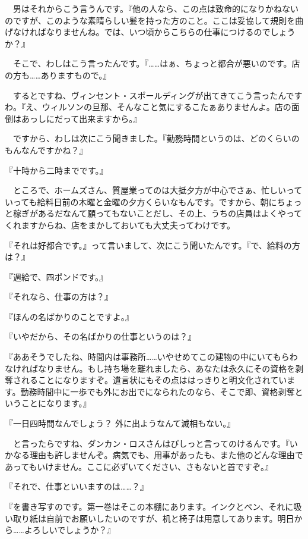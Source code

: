 \documentclass[tate,paper=b6j,jafontsize=9pt]{jlreq}
\begin{document}
　男はそれからこう言うんです。『他の人なら、この点は致命的になりかねないのですが、このような素晴らしい髪を持った方のこと。ここは妥協して規則を曲げなければなりませんね。では、いつ頃からこちらの仕事につけるのでしょうか？』

　そこで、わしはこう言ったんです。『……はぁ、ちょっと都合が悪いのです。店の方も……ありますもので。』

　するとですね、ヴィンセント・スポールディングが出てきてこう言ったんですわ。『え、ウィルソンの旦那、そんなこと気にするこたぁありませんよ。店の面倒はあっしにだって出来ますから。』

　ですから、わしは次にこう聞きました。『勤務時間というのは、どのくらいのもんなんですかね？』

『十時から二時までです。』

　ところで、ホームズさん、質屋業ってのは大抵夕方が中心でさぁ、忙しいっていっても給料日前の木曜と金曜の夕方くらいなもんです。ですから、朝にちょっと稼ぎがあるだなんて願ってもないことだし、その上、うちの店員はよくやってくれますからね、店をまかしておいても大丈夫ってわけです。

『それは好都合です。』って言いまして、次にこう聞いたんです。『で、給料の方は？』

『週給で、四ポンドです。』

『それなら、仕事の方は？』

『ほんの名ばかりのことですよ。』

『いやだから、その名ばかりの仕事というのは？』

『ああそうでしたね、時間内は事務所……いやせめてこの建物の中にいてもらわなければなりません。もし持ち場を離れましたら、あなたは永久にその資格を剥奪されることになりますぞ。遺言状にもその点ははっきりと明文化されています。勤務時間中に一歩でも外にお出でになられたのなら、そこで即、資格剥奪ということになります。』

『一日四時間なんでしょう？ 外に出ようなんて滅相もない。』

　と言ったらですね、ダンカン・ロスさんはびしっと言ってのけるんです。『いかなる理由も許しませんぞ。病気でも、用事があったも、また他のどんな理由であってもいけません。ここに必ずいてください、さもないと首ですぞ。』

『それで、仕事といいますのは……？』

『を書き写すのです。第一巻はそこの本棚にあります。インクとペン、それに吸い取り紙は自前でお願いしたいのですが、机と椅子は用意してあります。明日から……よろしいでしょうか？』
\end{document}
